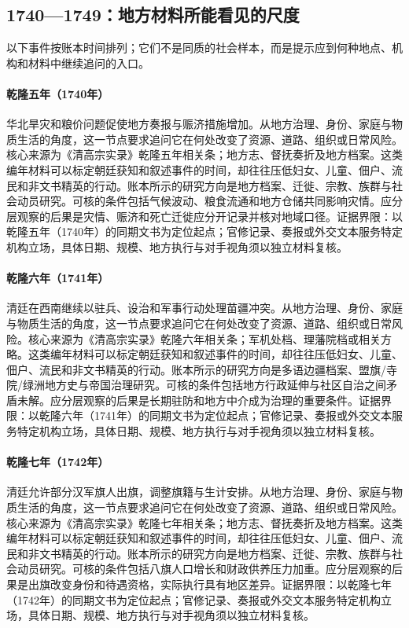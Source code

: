 \subsection{1740—1749：地方材料所能看见的尺度}
以下事件按账本时间排列；它们不是同质的社会样本，而是提示应到何种地点、机构和材料中继续追问的入口。
\hypertarget{social:EQ-1740-NORTH-CHINA-FAMINE}{}\paragraph{乾隆五年（1740年）}华北旱灾和粮价问题促使地方奏报与赈济措施增加。从地方治理、身份、家庭与物质生活的角度，这一节点要求追问它在何处改变了资源、道路、组织或日常风险。核心来源为《清高宗实录》乾隆五年相关条；地方志、督抚奏折及地方档案。这类编年材料可以标定朝廷获知和叙述事件的时间，却往往压低妇女、儿童、佃户、流民和非文书精英的行动。账本所示的研究方向是地方档案、迁徙、宗教、族群与社会动员研究。可核的条件包括气候波动、粮食流通和地方仓储共同影响灾情。应分层观察的后果是灾情、赈济和死亡迁徙应分开记录并核对地域口径。证据界限：以乾隆五年（1740年）的同期文书为定位起点；官修记录、奏报或外交文本服务特定机构立场，具体日期、规模、地方执行与对手视角须以独立材料复核。
\hypertarget{social:EQ-1741-MIAO-FRONTIER-CAMPAIGN}{}\paragraph{乾隆六年（1741年）}清廷在西南继续以驻兵、设治和军事行动处理苗疆冲突。从地方治理、身份、家庭与物质生活的角度，这一节点要求追问它在何处改变了资源、道路、组织或日常风险。核心来源为《清高宗实录》乾隆六年相关条；军机处档、理藩院档或相关方略。这类编年材料可以标定朝廷获知和叙述事件的时间，却往往压低妇女、儿童、佃户、流民和非文书精英的行动。账本所示的研究方向是多语边疆档案、盟旗/寺院/绿洲地方史与帝国治理研究。可核的条件包括地方行政延伸与社区自治之间矛盾未解。应分层观察的后果是长期驻防和地方中介成为治理的重要条件。证据界限：以乾隆六年（1741年）的同期文书为定位起点；官修记录、奏报或外交文本服务特定机构立场，具体日期、规模、地方执行与对手视角须以独立材料复核。
\hypertarget{social:EQ-1742-BANNER-EXIT-ORDER}{}\paragraph{乾隆七年（1742年）}清廷允许部分汉军旗人出旗，调整旗籍与生计安排。从地方治理、身份、家庭与物质生活的角度，这一节点要求追问它在何处改变了资源、道路、组织或日常风险。核心来源为《清高宗实录》乾隆七年相关条；地方志、督抚奏折及地方档案。这类编年材料可以标定朝廷获知和叙述事件的时间，却往往压低妇女、儿童、佃户、流民和非文书精英的行动。账本所示的研究方向是地方档案、迁徙、宗教、族群与社会动员研究。可核的条件包括八旗人口增长和财政供养压力加重。应分层观察的后果是出旗改变身份和待遇资格，实际执行具有地区差异。证据界限：以乾隆七年（1742年）的同期文书为定位起点；官修记录、奏报或外交文本服务特定机构立场，具体日期、规模、地方执行与对手视角须以独立材料复核。
